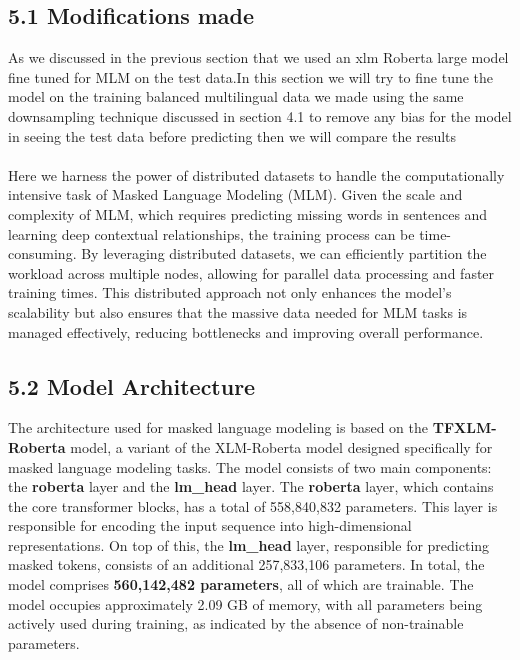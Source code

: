 \documentclass{article}
\begin{document}
\subsection*{5.1 Modifications made}
As we discussed in the previous section that we used an xlm Roberta large model fine tuned for MLM on the test data.In this section we will try to fine tune the model on the training balanced multilingual data we made using the same downsampling technique discussed in section 4.1 to remove any bias for the model in seeing the test data before predicting then we will compare the results
\\
\\
Here we harness the power of distributed datasets to handle the computationally intensive task of Masked Language Modeling (MLM). Given the scale and complexity of MLM, which requires predicting missing words in sentences and learning deep contextual relationships, the training process can be time-consuming. By leveraging distributed datasets, we can efficiently partition the workload across multiple nodes, allowing for parallel data processing and faster training times. This distributed approach not only enhances the model's scalability but also ensures that the massive data needed for MLM tasks is managed effectively, reducing bottlenecks and improving overall performance.
\\
\subsection*{5.2 Model Architecture}
The architecture used for masked language modeling is based on the \textbf{TFXLM-Roberta} model, a variant of the XLM-Roberta model designed specifically for masked language modeling tasks. The model consists of two main components: the \textbf{roberta} layer and the \textbf{lm\_head} layer. The \textbf{roberta} layer, which contains the core transformer blocks, has a total of 558,840,832 parameters. This layer is responsible for encoding the input sequence into high-dimensional representations. On top of this, the \textbf{lm\_head} layer, responsible for predicting masked tokens, consists of an additional 257,833,106 parameters. In total, the model comprises \textbf{560,142,482 parameters}, all of which are trainable. The model occupies approximately 2.09 GB of memory, with all parameters being actively used during training, as indicated by the absence of non-trainable parameters.
\\
\\
\end{document}
